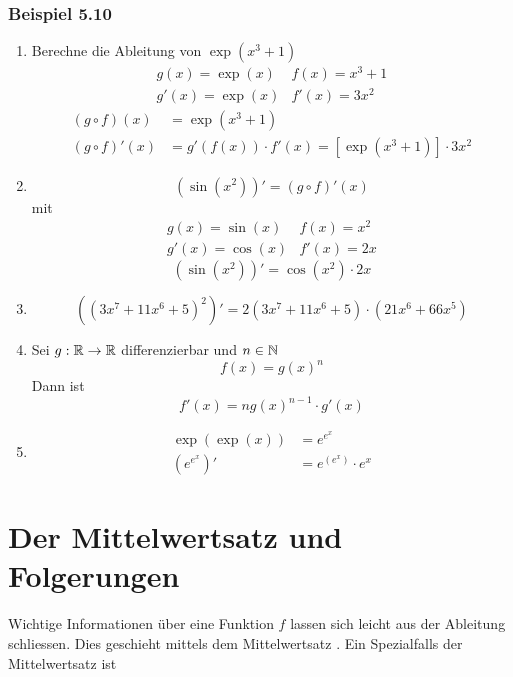 \subsubsection*{Beispiel 5.10}
\begin{enumerate}
\item Berechne die Ableitung von $\exp\left( x^3+1\right)$
\[\begin{array}{*{20}{l}}
{g\left( x \right) = \exp \left( x \right)}&{f\left( x \right) = {x^3} + 1}\\
{g'\left( x \right) = \exp \left( x \right)}&{f'\left( x \right) = 3{x^2}}
\end{array}\]
\begin{align*}
\left( g\circ f\right) \left( x\right) &= \exp\left( x^3+1\right)\\
\left( g\circ f\right)' \left( x\right) &= g'\left( f\left( x\right)\right)\cdot f'\left( x\right)=\left[ \exp\left( x^3+1\right) \right]\cdot 3x^2
\end{align*}
\item \[ \left( \sin\left( x^2\right) \right)'=\left( g\circ f\right)'\left( x\right)\] mit 
\[\begin{array}{*{20}{l}}
{g\left( x \right) = \sin \left( x \right)}&{f\left( x \right) = {x^2}}\\
{g'\left( x \right) = \cos \left( x \right)}&{f'\left( x \right) = 2x}
\end{array}\]
\[\left( \sin\left( x^2\right) \right)'=\cos\left( x^2\right)\cdot 2x\]
\item \[\left( {{{\left( {3{x^7} + 11{x^6} + 5} \right)}^2}} \right)' = 2\left( {3{x^7} + 11{x^6} + 5} \right) \cdot \left( {21{x^6} + 66{x^5}} \right)\]
\item Sei $g:\mathbb{R}\to\mathbb{R}$ differenzierbar und $n\in\mathbb{N}$ \[ f\left( x\right) = g\left( x\right)^n\]
Dann ist \[f'\left( x\right)=ng\left( x\right)^{n-1}\cdot g'\left( x\right)\]
\item \begin{align*}
\exp\left( \exp\left( x\right)\right)&=e^{e^x}\\
\left( e^{e^x}\right)'&=e^{\left( e^x\right)}\cdot e^x
\end{align*}
\end{enumerate}

\section{Der Mittelwertsatz und Folgerungen}
Wichtige Informationen über eine Funktion $f$ lassen sich leicht aus der Ableitung schliessen. Dies geschieht mittels dem Mittelwertsatz . Ein Spezialfalls der Mittelwertsatz ist
